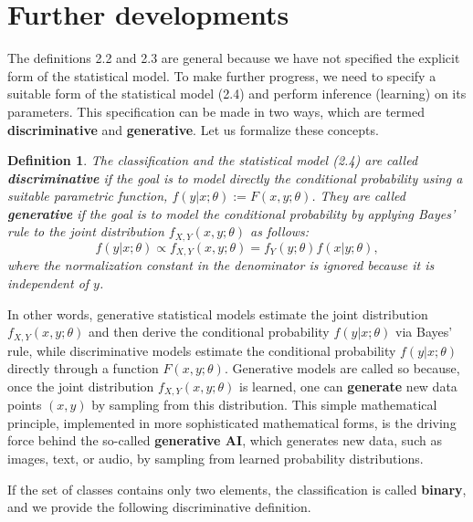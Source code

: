\documentclass{report}
\newtheorem{definition}{Definition}[chapter]
\begin{document}
\section{Further developments}
The definitions 2.2 and 2.3 are general because we have not specified the explicit form of the statistical model. To make further progress, we need to specify a suitable form of the statistical model (2.4) and perform inference (learning) on its parameters. This specification can be made in two ways, which are termed \textbf{discriminative} and \textbf{generative}. Let us formalize these concepts.

\begin{definition}

The classification and the statistical model (2.4) are called \textbf{discriminative} if the goal is to model directly the conditional probability using a suitable parametric function, $f(y|x;\theta) := F(x, y;\theta)$. They are called \textbf{generative} if the goal is to model the conditional probability by applying Bayes' rule to the joint distribution $f_{X,Y}(x,y;\theta)$ as follows:
\begin{equation}
f(y|x;\theta) \propto f_{X,Y}(x,y;\theta) = f_Y(y;\theta)f(x|y;\theta),
\end{equation}
where the normalization constant in the denominator is ignored because it is independent of $y$.
\end{definition}
In other words, generative statistical models estimate the joint distribution $f_{X,Y}(x,y;\theta)$ and then derive the conditional probability $f(y|x;\theta)$ via Bayes' rule, while discriminative models estimate the conditional probability $f(y|x;\theta)$ directly through a function $F(x,y;\theta)$. Generative models are called so because, once the joint distribution $f_{X,Y}(x,y;\theta)$ is learned, one can \textbf{generate} new data points $(x,y)$ by sampling from this distribution. This simple mathematical principle, implemented in more sophisticated mathematical forms, is the driving force behind the so-called \textbf{generative AI}, which generates new data, such as images, text, or audio, by sampling from learned probability distributions.

If the set of classes contains only two elements, the classification is called \textbf{binary}, and we provide the following discriminative definition.
\end{document}
